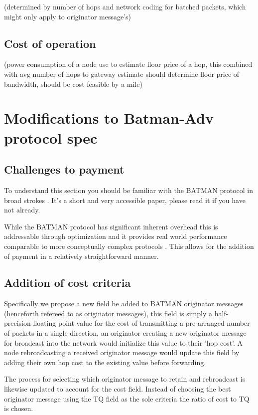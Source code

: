 \documentclass[11pt]{article}
\begin{document}
    (determined by number of hops and network coding for batched packets, which might only apply to originator message's)

    \subsection{Cost of operation}

    (power consumption of a node use to estimate floor price of a hop, this combined with avg number of hops to gateway estimate should determine floor price of bandwidth, should be cost feasible by a mile)

\section{Modifications to Batman-Adv protocol spec}

	\subsection{Challenges to payment}

	To understand this section you should be familiar with the BATMAN protocol in broad strokes \cite{batman}. It's a short and very accessible paper, please read it if you have not already.

	While the BATMAN protocol has significant inherent overhead this is addressable through optimization \cite{catwoman, batroam} and it provides real world performance comparable to more conceptually complex protocols \cite{meshperf}. This allows for the addition of payment in a relatively straightforward manner.

	\subsection{Addition of cost criteria}

		Specifically we propose a new field be added to BATMAN originator messages (henceforth refereed to as originator messages), this field is simply a half-precision floating point value for the cost of transmitting a pre-arranged number of packets in a single direction, an originator creating a new originator message for broadcast into the network would initialize this value to their 'hop cost'. A node rebroadcasting a received originator message would update this field by adding their own hop cost to the existing value before forwarding.

	        The process for selecting which originator message to retain and rebroadcast is likewise updated to account for the cost field. Instead of choosing the best originator message using the TQ field as the sole criteria the ratio of cost to TQ is chosen.
\end{document}
